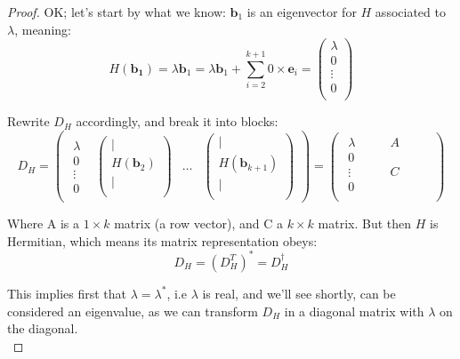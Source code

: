 \documentclass[solutions.tex]{subfiles}
\renewcommand{\bm}[1]{\pmb{#1}}
\begin{document}
\begin{proof}
OK; let's start by what we know: $\bm{b}_1$ is an eigenvector for $H$ associated
to $\lambda$, meaning:
\[
	H(\bm{b_1}) = \lambda\bm{b}_1
		= \lambda\bm{b}_1 + \sum_{i=2}^{k+1} 0 \times \bm{e}_i
		= \begin{pmatrix}
			\lambda \\
			0       \\
			\vdots \\
			0      \\
		\end{pmatrix}
\]

Rewrite $D_H$ accordingly, and break it into blocks:
\[
	D_H = \begin{pmatrix}
		\begin{matrix}
			\lambda \\
			0 \\
			\vdots \\
			0
		\end{matrix} &
		\begin{pmatrix}
			\bigg\vert \\
			H(\bm{b}_2) \\
			\bigg\vert \\
		\end{pmatrix} &
		\ldots &
		\begin{pmatrix}
			\bigg\vert \\
			H(\bm{b}_{k+1}) \\
			\bigg\vert \\
		\end{pmatrix}
	\end{pmatrix} = \begin{pmatrix}\begin{array}{c|c}
		\lambda & \qquad A \qquad\\
		\hline
		0       & \qquad ~ \qquad \\
		\vdots  & \qquad C \qquad \\
		0       & \qquad ~ \qquad \\
	\end{array}\end{pmatrix}
\]

Where A is a $1\times k$ matrix (a row vector), and C
 a $k\times k$ matrix. But then $H$ is Hermitian, which
means its matrix representation obeys:
\[
	D_H = (D_H^T)^* = D_H^\dagger
\]

This implies first that $\lambda = \lambda^*$, i.e $\lambda$ is
real, and we'll see shortly, can be considered an eigenvalue,
as we can transform $D_H$ in a diagonal matrix with $\lambda$
on the diagonal. \\


\end{proof}
\end{document}
